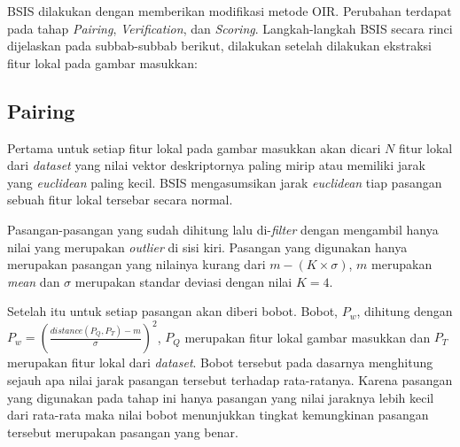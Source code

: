 BSIS dilakukan dengan memberikan modifikasi metode OIR. Perubahan terdapat pada tahap \textit{Pairing}, \textit{Verification}, dan \textit{Scoring}. Langkah-langkah BSIS secara rinci dijelaskan pada subbab-subbab berikut, dilakukan setelah dilakukan ekstraksi fitur lokal pada gambar masukkan:

\subsection{Pairing}
Pertama untuk setiap fitur lokal pada gambar masukkan akan dicari $N$ fitur lokal dari \textit{dataset} yang nilai vektor deskriptornya paling mirip atau memiliki jarak yang \textit{euclidean} paling kecil. BSIS mengasumsikan jarak \textit{euclidean} tiap pasangan sebuah fitur lokal tersebar secara normal. 

Pasangan-pasangan yang sudah dihitung lalu di-\textit{filter} dengan mengambil hanya nilai yang merupakan \textit{outlier} di sisi kiri. Pasangan yang digunakan hanya merupakan pasangan yang nilainya kurang dari $m - (K \times \sigma)$, $m$ merupakan \textit{mean} dan $\sigma$ merupakan standar deviasi dengan nilai $K = 4$.

Setelah itu untuk setiap pasangan akan diberi bobot. Bobot, $P_w$, dihitung dengan $P_w=(\frac{distance(P_Q, P_T) - m}{\sigma})^2$, $P_Q$ merupakan fitur lokal gambar masukkan dan $P_T$ merupakan fitur lokal dari \textit{dataset}. Bobot tersebut pada dasarnya menghitung sejauh apa nilai jarak pasangan tersebut terhadap rata-ratanya. Karena pasangan yang digunakan pada tahap ini hanya pasangan yang nilai jaraknya lebih kecil dari rata-rata maka nilai bobot menunjukkan tingkat kemungkinan pasangan tersebut merupakan pasangan yang benar.


